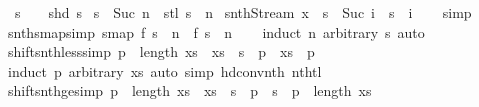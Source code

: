 \begin{isabellebody}
\ \ {\isachardoublequoteopen}s\ {\isacharbang}{\isacharbang}\ {}\ {\isacharequal}\ shd\ s{\isachardoublequoteclose}\isanewline
{\isacharbar}\ {\isachardoublequoteopen}s\ {\isacharbang}{\isacharbang}\ Suc\ n\ {\isacharequal}\ stl\ s\ {\isacharbang}{\isacharbang}\ n{\isachardoublequoteclose}\isanewline
\isanewline
{}\isamarkupfalse%
\ snth{\isacharunderscore}Stream{\isacharcolon}\ {\isachardoublequoteopen}{\isacharparenleft}x\ {\isacharhash}{\isacharhash}\ s{\isacharparenright}\ {\isacharbang}{\isacharbang}\ Suc\ i\ {\isacharequal}\ s\ {\isacharbang}{\isacharbang}\ i{\isachardoublequoteclose}\isanewline
%
\isadelimproof
\ \ %
\endisadelimproof
%
\isatagproof
{}\isamarkupfalse%
\ simp%
\endisatagproof
{\isafoldproof}%
%
\isadelimproof
\isanewline
%
\endisadelimproof
\isanewline
{}\isamarkupfalse%
\ snth{\isacharunderscore}smap{\isacharbrackleft}simp{\isacharbrackright}{\isacharcolon}\ {\isachardoublequoteopen}smap\ f\ s\ {\isacharbang}{\isacharbang}\ n\ {\isacharequal}\ f\ {\isacharparenleft}s\ {\isacharbang}{\isacharbang}\ n{\isacharparenright}{\isachardoublequoteclose}\isanewline
%
\isadelimproof
\ \ %
\endisadelimproof
%
\isatagproof
{}\isamarkupfalse%
\ {\isacharparenleft}induct\ n\ arbitrary{\isacharcolon}\ s{\isacharparenright}\ auto%
\endisatagproof
{\isafoldproof}%
%
\isadelimproof
\isanewline
%
\endisadelimproof
\isanewline
{}\isamarkupfalse%
\ shift{\isacharunderscore}snth{\isacharunderscore}less{\isacharbrackleft}simp{\isacharbrackright}{\isacharcolon}\ {\isachardoublequoteopen}p\ {\isacharless}\ length\ xs\ {\isasymLongrightarrow}\ {\isacharparenleft}xs\ {\isacharat}{\isacharminus}\ s{\isacharparenright}\ {\isacharbang}{\isacharbang}\ p\ {\isacharequal}\ xs\ {\isacharbang}\ p{\isachardoublequoteclose}\isanewline
%
\isadelimproof
\ \ %
\endisadelimproof
%
\isatagproof
{}\isamarkupfalse%
\ {\isacharparenleft}induct\ p\ arbitrary{\isacharcolon}\ xs{\isacharparenright}\ {\isacharparenleft}auto\ simp{\isacharcolon}\ hd{\isacharunderscore}conv{\isacharunderscore}nth\ nth{\isacharunderscore}tl{\isacharparenright}%
\endisatagproof
{\isafoldproof}%
%
\isadelimproof
\isanewline
%
\endisadelimproof
\isanewline
{}\isamarkupfalse%
\ shift{\isacharunderscore}snth{\isacharunderscore}ge{\isacharbrackleft}simp{\isacharbrackright}{\isacharcolon}\ {\isachardoublequoteopen}p\ {\isasymge}\ length\ xs\ {\isasymLongrightarrow}\ {\isacharparenleft}xs\ {\isacharat}{\isacharminus}\ s{\isacharparenright}\ {\isacharbang}{\isacharbang}\ p\ {\isacharequal}\ s\ {\isacharbang}{\isacharbang}\ {\isacharparenleft}p\ {\isacharminus}\ length\ xs{\isacharparenright}{\isachardoublequoteclose}\isanewline

\end{isabellebody}
